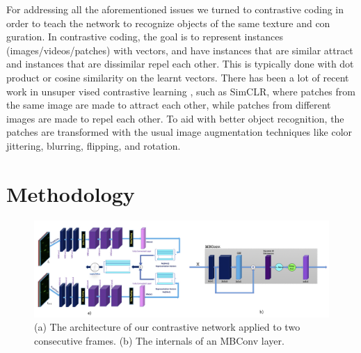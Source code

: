 \documentclass[./dissertation.tex]{subfiles}
\begin{document}
For addressing all the aforementioned issues we turned to contrastive coding in order to teach the network to recognize objects of the same texture and con guration. In contrastive coding, the goal is to represent instances (images/videos/patches) with vectors, and have instances that are similar attract and instances that are dissimilar repel each other. This is typically done with dot product or cosine similarity on the learnt vectors. There has been a lot of recent work in unsuper vised contrastive learning \cite{oord2018representation,he2020momentum,chen2020improved}, such as SimCLR\cite{chen2020simple,chen2020big}, where patches from the same image are made to attract each other, while patches from different images are made to repel each other. To aid with better object recognition, the patches are transformed with the usual image augmentation techniques like color jittering, blurring, flipping, and rotation.






\label{cc:Methodology}
\section{Methodology}
\begin{figure}
    \includegraphics[width=\textwidth]{./figures/cc/arch.png}
    \caption{(a) The architecture of our contrastive network applied to two consecutive frames. (b) The internals of an MBConv layer.} \label{fig:architecture}
\end{figure}
\end{document}
